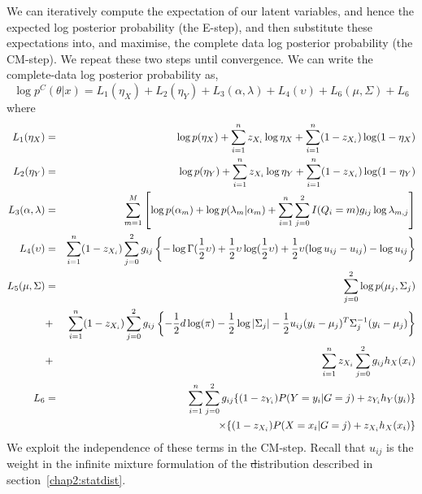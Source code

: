  We can iteratively compute the expectation of our latent variables, and hence the expected log posterior probability (the E-step), and then substitute these expectations into, and maximise, the complete data log posterior probability (the CM-step). We repeat these two steps until convergence. We can write the complete-data log posterior probability as,
\begin{equation} \log p^C(\theta|x) =  L_1(\eta_X) + L_2(\eta_Y) + L_3(\alpha,\lambda) + L_4(\upsilon) + L_6(\mu,\Sigma) + L_6 \nonumber \end{equation}
where
\begin{eqnarray}
L_1(\eta_X) &= &\log p(\eta_X) + \sum_{i=1}^nz_{X_i}\log\eta_X + \sum_{i=1}^n(1-z_{X_i})\log(1-\eta_X) \label{l1} \\
L_2(\eta_Y) & = & \log p(\eta_Y) + \sum_{i=1}^nz_{X_i}\log\eta_Y + \sum_{i=1}^n(1-z_{X_i})\log(1-\eta_Y) \\
L_3(\alpha,\lambda) &=& \sum_{m=1}^M\left[ \log p(\alpha_m) + \log p(\lambda_m|\alpha_m) +  \sum_{i=1}^n\sum_{j=0}^2 I(Q_i=m)g_{ij} \log\lambda_{m,j}\right] \label{l3} \\
L_4(\upsilon) & = & \sum_{i=1}^n(1-z_{X_i})\sum_{j=0}^2 g_{ij} \left\{-\log\Gamma(\half\upsilon) + \half\upsilon\log(\half\upsilon)+\half\upsilon(\log u_{ij} -u_{ij}) - \log u_{ij} \right\} \nonumber \\
L_5(\mu,\Sigma) &=& \sum_{j=0}^2\log p(\mu_j,\Sigma_j)\nonumber\\ 
&+& \sum_{i=1}^n (1-z_{X_i}) \sum_{j=0}^2 g_{ij} \left\{-\half d\log(\pi) - \half\log|\Sigma_j|  - \half u_{ij}(y_i - \mu_j)^T\Sigma_j^{-1}(y_i - \mu_j)\right\} \nonumber\\
&+& \sum_{i=1}^n z_{X_i} \sum_{j=0}^2 g_{ij} h_X(x_i) \label{l5} \\
L_6 & =  &\sum_{i=1}^n\sum_{j=0}^2 g_{ij} \{ (1-z_{Y_i})  P(Y=y_i|G=j) + z_{Y_i}h_Y(y_i) \} \\
&& ~~~~~~\times \{ (1-z_{X_i})  P(X=x_i|G=j) + z_{X_i}h_X(x_i) \}
\end{eqnarray}
We exploit the independence of these terms in the CM-step.  Recall that $u_{ij}$ is the weight in the infinite mixture formulation of the \st distribution described in section~\ref{chap2:statdist}.
